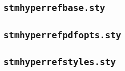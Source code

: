\documentclass[%
  type=article,%
  layout=koma,%
  conditionallox=true,%
  conditionalloxnewpage=false,%
  date=true,%
  index=true,%
  listings=true%
]{stmtext}
\begin{document}


\subsection{\protect\texttt{stmhyperrefbase.sty}}
\label{sec:code:base}



\subsection{\protect\texttt{stmhyperrefpdfopts.sty}}
\label{sec:code:pdfopts}



\subsection{\protect\texttt{stmhyperrefstyles.sty}}
\label{sec:code:styles}


\end{document}
